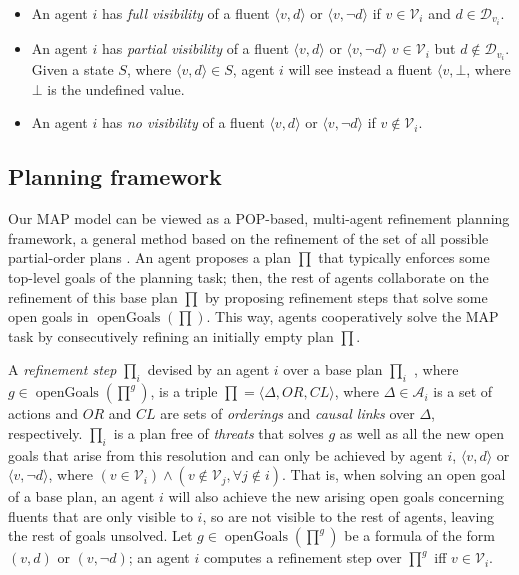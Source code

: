 \documentclass[12pt]{article}
\DeclareMathOperator{\openGoals}{openGoals}
\begin{document}
\begin{itemize}
  \item An agent $i$ has \textit{full visibility} of a fluent $\langle v,d\rangle$ or $\langle v,\neg d\rangle$ if $v \in \mathcal{V}_i$ and $d \in \mathcal{D}_{v_i}$.
  \item An agent $i$ has \textit{partial visibility} of a fluent $\langle v,d\rangle$ or $\langle v,\neg d\rangle$ $v \in \mathcal{V}_i$ but $d \notin \mathcal{D}_{v_i}$.
Given a state $S$, where $\langle v,d\rangle \in S$, agent $i$ will see instead a fluent $\langle v, \bot$, where $\bot$ is the undefined value.
  \item An agent $i$ has \textit{no visibility} of a fluent $\langle v,d\rangle$ or $\langle v,\neg d\rangle$ if $v \notin \mathcal{V}_i$.
\end{itemize}

\subsection{Planning framework}

Our MAP model can be viewed as a POP-based, multi-agent refinement planning framework, a general method based on the refinement of the set of all possible partial-order plans \cite{Kambhampati_1997}.
An agent proposes a plan $\prod$ that typically enforces some top-level goals of the planning task; then, the rest of agents collaborate on the refinement of this base plan $\prod$ by proposing refinement steps that solve some open goals in $\openGoals(\prod)$.
This way, agents cooperatively solve the MAP task by consecutively refining an initially empty plan $\prod$.

A \textit{refinement step} $\prod_i$ devised by an agent $i$ over a base plan $\prod_i$ , where $g \in \openGoals(\prod^g)$, is a triple $\prod = \langle \Delta, OR, CL\rangle$, where $\Delta \in \mathcal{A}_i$ is a set of actions and $OR$ and $CL$ are sets of \textit{orderings} and \textit{causal links} over $\Delta$, respectively.
$\prod_i$ is a plan free of \textit{threats} \cite{Younes2003VHPOPVH} that solves $g$ as well as all the new open goals that arise from this resolution and can only be achieved by agent $i$, $\langle v, d\rangle$ or $\langle v, \neg d\rangle$, where $(v \in \mathcal{V}_i) \wedge (v \notin \mathcal{V}_j, \forall j \notin i)$.
That is, when solving an open goal of a base plan, an agent $i$ will also achieve the new arising open goals concerning fluents that are only visible to $i$, so are not visible to the rest of agents, leaving the rest of goals unsolved.
Let $g \in \openGoals(\prod^g)$ be a formula of the form $(v, d)$ or $(v, ¬d)$; an agent $i$ computes a refinement step over $\prod^g$ iff $v \in \mathcal{V}_i$.
\end{document}
